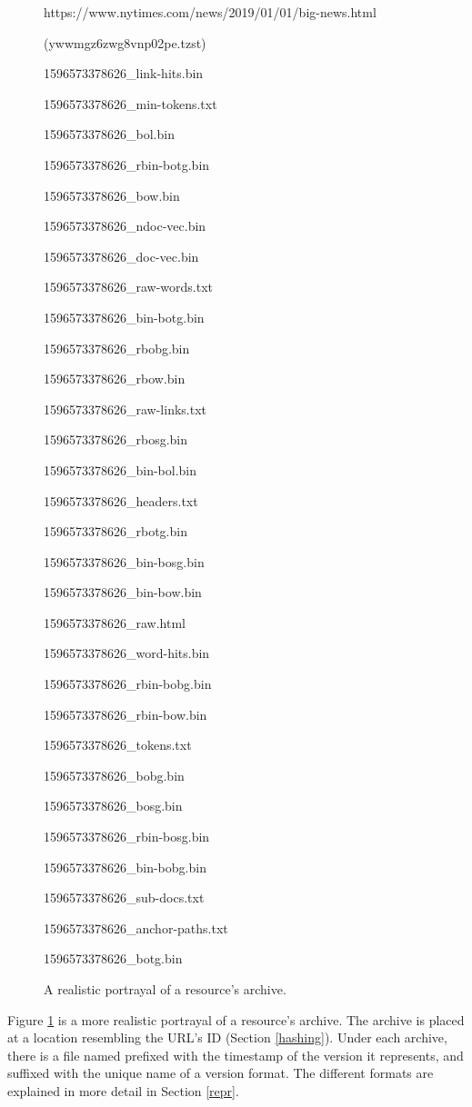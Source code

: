 \begin{figure}
\begin{nodeC}
	\item{https://www.nytimes.com/news/2019/01/01/big-news.html}
	\item{(ywwmgz6zwg8vnp02pe.tzst)}
	\begin{nodeC}
		\item{1596573378626\_link-hits.bin}
		\item{1596573378626\_min-tokens.txt}
		\item{1596573378626\_bol.bin}
		\item{1596573378626\_rbin-botg.bin}
		\item{1596573378626\_bow.bin}
		\item{1596573378626\_ndoc-vec.bin}
		\item{1596573378626\_doc-vec.bin}
		\item{1596573378626\_raw-words.txt}
		\item{1596573378626\_bin-botg.bin}
		\item{1596573378626\_rbobg.bin}
		\item{1596573378626\_rbow.bin}
		\item{1596573378626\_raw-links.txt}
		\item{1596573378626\_rbosg.bin}
		\item{1596573378626\_bin-bol.bin}
		\item{1596573378626\_headers.txt}
		\item{1596573378626\_rbotg.bin}
		\item{1596573378626\_bin-bosg.bin}
		\item{1596573378626\_bin-bow.bin}
		\item{1596573378626\_raw.html}
		\item{1596573378626\_word-hits.bin}
		\item{1596573378626\_rbin-bobg.bin}
		\item{1596573378626\_rbin-bow.bin}
		\item{1596573378626\_tokens.txt}
		\item{1596573378626\_bobg.bin}
		\item{1596573378626\_bosg.bin}
		\item{1596573378626\_rbin-bosg.bin}
		\item{1596573378626\_bin-bobg.bin}
		\item{1596573378626\_sub-docs.txt}
		\item{1596573378626\_anchor-paths.txt}
		\item{1596573378626\_botg.bin}
	\end{nodeC}
\end{nodeC}
\caption{A realistic portrayal of a resource's archive.}
\label{real-arc}
\end{figure}

Figure \ref{real-arc} is a more realistic portrayal of a resource's
archive.  The archive is placed at a location resembling the
URL's ID (Section \ref{hashing}).  Under each archive, there is
a file named prefixed with the timestamp of the version it
represents, and suffixed with the unique name of a version
format.  The different formats are explained in more detail in
Section \ref{repr}.